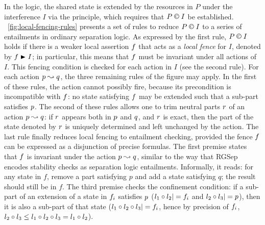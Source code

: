 In the logic, the shared state is extended by the resources in
$P$ under the interference $I$ via the \extendRule principle,
which requires that $P\containI I$ be
established. \fig~\ref{fig:local-fencing-rules} presents a set of
rules to reduce $P \containI I$ to a series of entailments in
ordinary separation logic. As expressed by the first rule,
$P \containI I$ holds if there is a weaker local assertion $\lass{F}$
that acts as a \emph{local fence} for $I$, denoted by
$\lass{F}\strictfences I$; in particular, this means that $\lass{F}$
must be invariant under all actions of $I$. This fencing condition is
checked for each action in $I$ (see the second rule). For each action
$\lass{P}\swap \lass{Q}$, the three remaining rules of the figure may
apply. In the first of these rules, the action cannot possibly fire,
because its precondition is incompatible with $\lass{F}$: no state
satisfying $\lass{F}$ may be extended such that a sub-part satisfies
$\lass{P}$. The second of these rules allows one to trim neutral parts
$\lass{R}$ of an action $\lass{P}\swap \lass{Q}$: if $\lass{R}$
appears both in $\lass{P}$ and $\lass{Q}$, and $\lass{R}$ is exact,
then the part of the state denoted by $\lass{R}$ is uniquely
determined and left unchanged by the action. The last rule finally
reduces local fencing to entailment checking, provided the fence
$\lass{F}$ can be expressed as a disjunction of precise formulas. The
first premise states that $\lass{F}$ is invariant under the action
$\lass{P}\swap \lass{Q}$, similar to the way that RGSep encodes
stability checks as separation logic entailments. Informally, it
reads: for any state in $f$, remove a part satisfying $p$ and add a
state satisfying $q$; the result should still be in $f$. The third
premise checks the confinement condition: if a sub-part of an
extension of a state in $\lass{F}_i$ satisfies $\lass{P}$
($l_1\composeL l_2|= \lass{F}_i$ and $l_2\composeL l_3 |= \lass{P}$),
then it is also a sub-part of that state ($l_1\composeL l_2\composeL
l_3|=\lass{F}_i$, hence by precision of $\lass{F}_i$, $l_2\circ
l_3\leq l_1\circ l_2\circ l_3 = l_1\circ l_2$).

